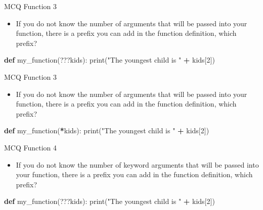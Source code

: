 \documentclass[
  8pt,
  ignorenonframetext,
]{beamer}
\newenvironment{Shaded}{\begin{snugshade}}{\end{snugshade}}
\newcommand{\BuiltInTok}[1]{#1}
\newcommand{\DecValTok}[1]{\textcolor[rgb]{0.00,0.00,0.81}{#1}}
\newcommand{\KeywordTok}[1]{\textcolor[rgb]{0.13,0.29,0.53}{\textbf{#1}}}
\newcommand{\NormalTok}[1]{#1}
\newcommand{\OperatorTok}[1]{\textcolor[rgb]{0.81,0.36,0.00}{\textbf{#1}}}
\newcommand{\StringTok}[1]{\textcolor[rgb]{0.31,0.60,0.02}{#1}}
\providecommand{\tightlist}{%
  \setlength{\itemsep}{0pt}\setlength{\parskip}{0pt}}
\begin{document}
\begin{frame}[fragile]{MCQ Function 3}
\protect\hypertarget{mcq-function-3}{}
\begin{itemize}
\tightlist
\item
  If you do not know the number of arguments that will be passed into
  your function, there is a prefix you can add in the function
  definition, which prefix?
\end{itemize}

\begin{Shaded}
\begin{Highlighting}[]
\KeywordTok{def}\NormalTok{ my\_function(???kids):}
  \BuiltInTok{print}\NormalTok{(}\StringTok{"The youngest child is "} \OperatorTok{+}\NormalTok{ kids[}\DecValTok{2}\NormalTok{])}
\end{Highlighting}
\end{Shaded}
\end{frame}

\begin{frame}[fragile]{MCQ Function 3}
\protect\hypertarget{mcq-function-3-1}{}
\begin{itemize}
\tightlist
\item
  If you do not know the number of arguments that will be passed into
  your function, there is a prefix you can add in the function
  definition, which prefix?
\end{itemize}

\begin{Shaded}
\begin{Highlighting}[]
\KeywordTok{def}\NormalTok{ my\_function(}\OperatorTok{*}\NormalTok{kids):}
  \BuiltInTok{print}\NormalTok{(}\StringTok{"The youngest child is "} \OperatorTok{+}\NormalTok{ kids[}\DecValTok{2}\NormalTok{])}
\end{Highlighting}
\end{Shaded}
\end{frame}

\begin{frame}[fragile]{MCQ Function 4}
\protect\hypertarget{mcq-function-4}{}
\begin{itemize}
\tightlist
\item
  If you do not know the number of keyword arguments that will be passed
  into your function, there is a prefix you can add in the function
  definition, which prefix?
\end{itemize}

\begin{Shaded}
\begin{Highlighting}[]
\KeywordTok{def}\NormalTok{ my\_function(???kids):}
  \BuiltInTok{print}\NormalTok{(}\StringTok{"The youngest child is "} \OperatorTok{+}\NormalTok{ kids[}\DecValTok{2}\NormalTok{])}
\end{Highlighting}
\end{Shaded}
\end{frame}
\end{document}

